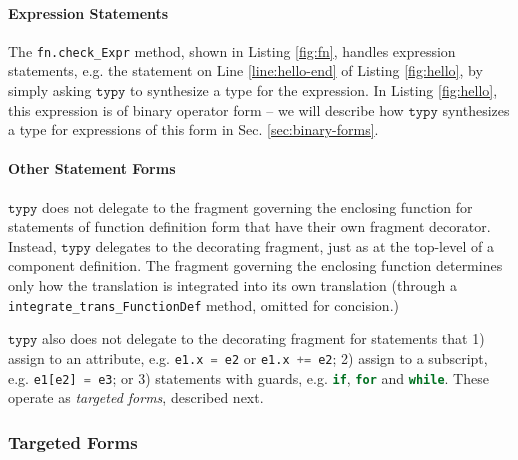 \documentclass[preprint,10pt]{sigplanconf}
\newcommand{\typy}{\texttt{typy}}
\newcommand{\lip}[1]{\lstinline[language=Python,basicstyle=\ttfamily\footnotesize,deletendkeywords={tuple,buffer,map}]{#1}}
\newcommand{\li}[1]{\lip{#1}}
\begin{document}
\vspace{-3px}\paragraph{Expression Statements} The \li{fn.check_Expr} method, shown in Listing \ref{fig:fn}, handles expression statements, e.g. the statement on Line \ref{line:hello-end} of Listing \ref{fig:hello}, by simply asking $\typy$ to synthesize a type for the expression. In Listing \ref{fig:hello}, this expression is of binary operator form -- we will describe how $\typy$ synthesizes a type for expressions of this form in Sec. \ref{sec:binary-forms}. 

\vspace{-3px}\paragraph{Other Statement Forms}
$\typy$ does not delegate to the fragment governing the enclosing function for statements of function definition form that have their own fragment decorator. Instead, $\typy$ delegates to the decorating fragment, just as at the top-level of a component definition. The fragment governing the enclosing function determines only how the translation is integrated into its own translation (through a \li{integrate_trans_FunctionDef} method, omitted for concision.)

$\typy$ also does not delegate to the decorating fragment for statements that 1) assign to an attribute, e.g. \li{e1.x = e2} or \li{e1.x += e2};  2) assign to a subscript, e.g. \li{e1[e2] = e3}; or 3) statements with guards, e.g. \li{if}, \li{for} and \li{while}.  These operate as \emph{targeted forms}, described next.

\subsubsection{Targeted Forms}\label{sec:targeted-forms}
\end{document}
